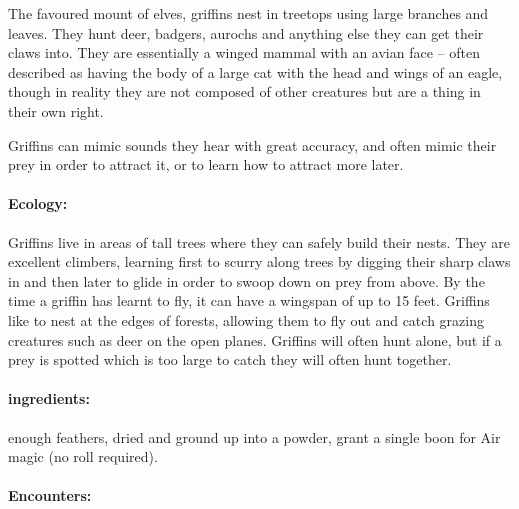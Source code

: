 \begin{multicols}{2}
\begin{boxtext}
\end{boxtext}

The favoured mount of elves, griffins nest in treetops using large branches and leaves.
They hunt deer, badgers, aurochs and anything else they can get their claws into.
They are essentially a winged mammal with an avian face -- often described as having the body of a large cat with the head and wings of an eagle, though in reality they are not composed of other creatures but are a thing in their own right.

Griffins can mimic sounds they hear with great accuracy, and often mimic their prey in order to attract it, or to learn how to attract more later.


\paragraph{Ecology:} Griffins live in areas of tall trees where they can safely build their nests.
They are excellent climbers, learning first to scurry along trees by digging their sharp claws in and then later to glide in order to swoop down on prey from above.
By the time a griffin has learnt to fly, it can have a wingspan of up to 15 feet.
Griffins like to nest at the edges of forests, allowing them to fly out and catch grazing creatures such as deer on the open planes.
Griffins will often hunt alone, but if a prey is spotted which is too large to catch  they will often hunt together.

\paragraph{\Glspl{ingredient}:}
enough feathers, dried and ground up into a powder, grant a single \gls{boon} for Air magic (no roll required).

\paragraph{Encounters:}

\begin{itemize}


\end{itemize}
\end{multicols}
